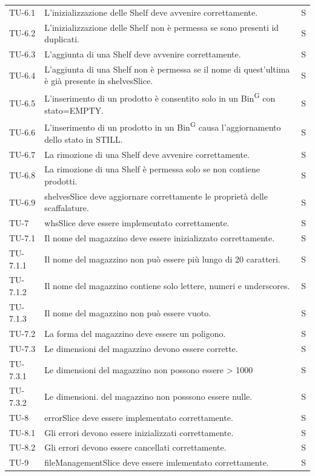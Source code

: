 \begin{xltabular}{0.9\textwidth}{X | p{0.6\textwidth} | p{0.1\textwidth} }
    TU-6.1 & L'inizializzazione delle Shelf deve avvenire correttamente. & S\\
    TU-6.2 & L'inizializzazione delle Shelf non è permessa se sono presenti id duplicati. & S\\
    TU-6.3 & L'aggiunta di una Shelf deve avvenire correttamente. & S\\
    TU-6.4 & L'aggiunta di una Shelf non è permessa se il nome di quest'ultima è già presente in shelvesSlice. & S\\
    TU-6.5 & L'inserimento di un prodotto è consentito solo in un Bin\textsuperscript{G} con stato=EMPTY. & S\\
    TU-6.6 & L'inserimento di un prodotto in un Bin\textsuperscript{G} causa l'aggiornamento dello stato in STILL. & S\\
    TU-6.7 & La rimozione di una Shelf deve avvenire correttamente. & S \\
    TU-6.8 & La rimozione di una Shelf è permessa solo se non contiene prodotti. & S\\
    TU-6.9 & shelvesSlice deve aggiornare correttamente le proprietà delle scaffalature. & S\\
    TU-7 & whsSlice deve essere implementato correttamente. & S\\
    TU-7.1 & Il nome del magazzino deve essere inizializzato correttamente. & S\\
    TU-7.1.1 & Il nome del magazzino non può essere più lungo di 20 caratteri. & S \\
    TU-7.1.2 & Il nome del magazzino contiene solo lettere, numeri e underscores. & S\\
    TU-7.1.3 & Il nome del magazzino non può essere vuoto. & S\\
    TU-7.2 & La forma del magazzino deve essere un poligono. & S\\
    TU-7.3 & Le dimensioni del magazzino devono essere corrette. & S\\ 
    TU-7.3.1 & Le dimensioni del magazzino non possono essere > 1000 & S\\
    TU-7.3.2 & Le dimensioni. del magazzino non posssono essere nulle. & S\\
    TU-8 & errorSlice deve essere implementato correttamente. & S\\
    TU-8.1 & Gli errori devono essere inizializzati correttamente. & S\\
    TU-8.2 & Gli errori devono essere cancellati correttamente. & S\\
    TU-9 & fileManagementSlice deve essere imlementato correttamente. &S\\

\end{xltabular}
